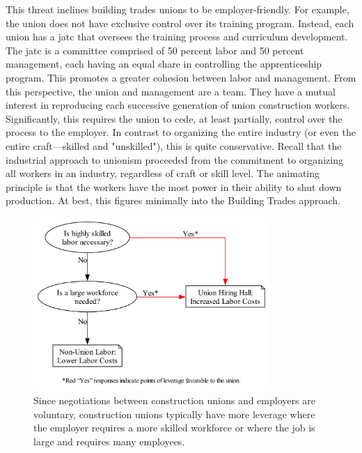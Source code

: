 \documentclass[12pt]{article}
\newcommand{\imageWidth}{0.8\textwidth}
\begin{document}
This threat inclines building trades unions to be employer-friendly. For example, the union does not have exclusive control over its training program. Instead, each union has a \acrfull{jatc} that oversees the training process and curriculum development. The \acrshort{jatc} is a committee comprised of 50 percent labor and 50 percent management, each having an equal share in controlling the apprenticeship program. This promotes a greater cohesion between labor and management. From this perspective, the union and management are a team. They have a mutual interest in reproducing each successive generation of union construction workers. Significantly, this requires the union to cede, at least partially, control over the process to the employer. In contrast to organizing the entire industry (or even the entire craft---skilled and "unskilled"), this is quite conservative. Recall that the industrial approach to unionism proceeded from the commitment to organizing all workers in an industry, regardless of craft or skill level. The animating principle is that the workers have the most power in their ability to shut down production. At best, this figures minimally into the Building Trades approach.

\begin{figure}[ht]
  \centering
  \includegraphics[width=\imageWidth]{images/union_power_red}
  \captionsetup{justification=centering, singlelinecheck=false, margin=2cm} 
  \caption[Union Leverage and Power]{Since negotiations between construction unions and employers are voluntary, construction unions typically have more leverage where the employer requires a more skilled workforce or where the job is large and requires many employees.}
  \label{fig:union_power_red}
\end{figure}
\end{document}
